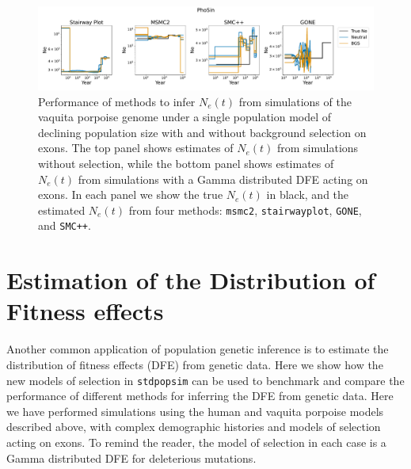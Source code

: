 \documentclass[hidelinks]{article}
\newcommand{\stdpopsim}{\texttt{stdpopsim}\xspace}
\newcommand{\msmc}{\texttt{msmc2}\xspace}
\newcommand{\stairway}{\texttt{stairwayplot}\xspace}
\newcommand{\gone}{\texttt{GONE}\xspace}
\newcommand{\smcpp}{\texttt{SMC++}\xspace}
\begin{document}
\begin{figure}[t]
    \centering
    \includegraphics[width=\textwidth]{figures/PhoSin/Vaquita2Epoch_1R22/estimated_Ne_t_final}
    \caption{
    \label{fig:1pop-vaquita-demography}
    Performance of methods to infer $N_e(t)$ from simulations of the vaquita porpoise genome under a single population
    model of declining population size \citep{robinson2022critically} with and without background selection on exons. 
    The top panel shows estimates of $N_e(t)$ from simulations
    without selection, while the bottom panel shows estimates of $N_e(t)$ from simulations with a Gamma distributed   
    DFE acting on exons. In each panel we show the true $N_e(t)$ in black, and the estimated $N_e(t)$ from four methods:    
    \msmc \citep{Schiffels2020}, \stairway \citep{liu2020stairway}, \gone \citep{santiago2020recent}, and \smcpp \citep{terhorst2017robust}.  
    }
\end{figure}

\section*{Estimation of the Distribution of Fitness effects}
    \label{dfe}
    Another common application of population genetic inference is to estimate the distribution of fitness effects (DFE)
    from genetic data. Here we show how the new models of selection in \stdpopsim can be used to benchmark and compare
    the performance of different methods for inferring the DFE from genetic data. Here we have performed simulations using the 
    human and vaquita porpoise models described above, with complex demographic histories and models of selection acting on exons.
    To remind the reader, the model of selection in each case is a Gamma distributed DFE for deleterious mutations.
\end{document}
